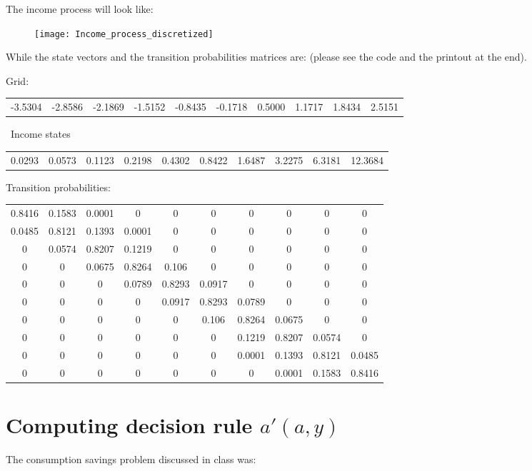 \documentclass[letter,11pt]{article}
\begin{document}
The income process will look like:
\begin{figure}[h!]
  \centering
        \texttt{[image: Income\_process\_discretized]}
  \end{figure}

While the state vectors and the transition probabilities matrices are: (please see the code and the printout at the end).

Grid: \\
\begin{tabular}{  | c | c| c| c |c |c |c |c |c |c |}
   -3.5304  & -2.8586 &  -2.1869  &  -1.5152 & -0.8435 &  -0.1718 &   0.5000 &   1.1717 & 1.8434 &  2.5151
\end{tabular}
\
Income states \\
\begin{tabular}{  | c | c| c| c |c |c |c |c |c |c |}
    0.0293  &  0.0573 &   0.1123 &   0.2198  &  0.4302  &  0.8422  &  1.6487  &  3.2275   & 6.3181& 12.3684
\end{tabular}

Transition probabilities:\\
\begin{tabular}{c c c c c c c c c c} \hline
 0.8416	&	0.1583	&	0.0001	&	0	&	0	&	0	&	0	&	0	&	0	&	0	\\
0.0485	&	0.8121	&	0.1393	&	0.0001	&	0	&	0	&	0	&	0	&	0	&	0	\\
0	&	0.0574	&	0.8207	&	0.1219	&	0	&	0	&	0	&	0	&	0	&	0	\\
0	&	0	&	0.0675	&	0.8264	&	0.106	&	0	&	0	&	0	&	0	&	0	\\
0	&	0	&	0	&	0.0789	&	0.8293	&	0.0917	&	0	&	0	&	0	&	0	\\
0	&	0	&	0	&	0	&	0.0917	&	0.8293	&	0.0789	&	0	&	0	&	0	\\
0	&	0	&	0	&	0	&	0	&	0.106	&	0.8264	&	0.0675	&	0	&	0	\\
0	&	0	&	0	&	0	&	0	&	0	&	0.1219	&	0.8207	&	0.0574	&	0	\\
0	&	0	&	0	&	0	&	0	&	0	&	0.0001	&	0.1393	&	0.8121	&	0.0485	\\
0	&	0	&	0	&	0	&	0	&	0	&	0	&	0.0001	&	0.1583	&	0.8416	\\ \hline
\end{tabular}


\section{Computing decision rule $a'(a,y)$}
\hfill

The consumption savings problem discussed in class was:
\end{document}
